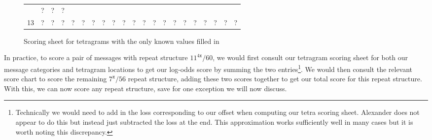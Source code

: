 \begin{figure}[H]
\begin{center}
{\begin{tabular}{|c|*{20}{c|}}
        & ?              & ?            & ?                             \\
        13            & ?              & ?            & ?             & ?
        & ?              & ?            & ?             & ?           &
        ?             & ?              & ?            & ?             & ?
        & ?              & ?            & ?             & ?
        & ?              & ?            & ?                             \\
        \hline
    \end{tabular}}
  \end{center}
  \caption{Scoring sheet for tetragrams with the only known values filled in~\cite[p.~106]{Alexander1945}}
\end{figure}
\noindent In practice, to score a pair of messages with repeat structure
$11^{4\texttt{x}}/60$, we would first consult our tetragram scoring
sheet for both our message categories and tetragram locations to get our
log-odds score by summing the two entries\footnote{Technically we
  would need to add in the loss corresponding to our offset when
  computing our tetra scoring sheet. Alexander does not appear to do
  this but instead just subtracted the loss at the end. This
  approximation works sufficiently well in many cases but it is worth
noting this discrepancy. }. We would then consult the relevant
score chart to score
the remaining $7^\texttt{x}/56$ repeat structure, adding these two
scores together to get our total score for this repeat structure.
With this, we can now score any repeat structure, save for one
exception we will now discuss.

